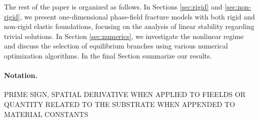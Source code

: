 The rest of the paper is organized as follows. In Sections \ref{sec:rigid} and \ref{sec:non-rigid}, we present one-dimensional phase-field fracture models with both rigid and non-rigid elastic foundations, focusing on the analysis  of linear stability regarding trivial solutions. In Section \ref{sec:numerics}, we investigate the nonlinear regime and discuss the selection of equilibrium branches using various numerical optimization algorithms. In the final Section  summarize our results.

\paragraph{Notation.} 
PRIME SIGN, SPATIAL DERIVATIVE WHEN APPLIED TO FIEELDS OR QUANTITY RELATED TO THE SUBSTRATE WHEN APPENDED TO MATERIAL CONSTANTS